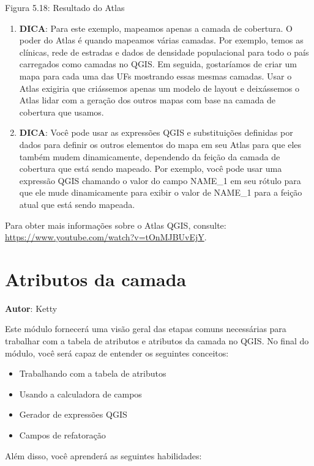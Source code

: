 \documentclass[
]{krantz}
\providecommand{\tightlist}{%
  \setlength{\itemsep}{0pt}\setlength{\parskip}{0pt}}
\begin{document}
Figura 5.18: Resultado do Atlas

\begin{enumerate}
\def\labelenumi{\arabic{enumi}.}
\setcounter{enumi}{6}
\item
  \textbf{DICA}: Para este exemplo, mapeamos apenas a camada de cobertura. O poder do Atlas é quando mapeamos várias camadas. Por exemplo, temos as clínicas, rede de estradas e dados de densidade populacional para todo o país carregados como camadas no QGIS. Em seguida, gostaríamos de criar um mapa para cada uma das UFs mostrando essas mesmas camadas. Usar o Atlas exigiria que criássemos apenas um modelo de layout e deixássemos o Atlas lidar com a geração dos outros mapas com base na camada de cobertura que usamos.
\item
  \textbf{DICA}: Você pode usar as expressões QGIS e substituições definidas por dados para definir os outros elementos do mapa em seu Atlas para que eles também mudem dinamicamente, dependendo da feição da camada de cobertura que está sendo mapeado. Por exemplo, você pode usar uma expressão QGIS chamando o valor do campo NAME\_1 em seu rótulo para que ele mude dinamicamente para exibir o valor de NAME\_1 para a feição atual que está sendo mapeada.
\end{enumerate}

Para obter mais informações sobre o Atlas QGIS, consulte: \url{https://www.youtube.com/watch?v=tOnMJBUvEjY}.

\hypertarget{atributos-da-camada}{%
\chapter{Atributos da camada}\label{atributos-da-camada}}

\textbf{Autor}: Ketty

Este módulo fornecerá uma visão geral das etapas comuns necessárias para trabalhar com a tabela de atributos e atributos da camada no QGIS. No final do módulo, você será capaz de entender os seguintes conceitos:

\begin{itemize}
\tightlist
\item
  Trabalhando com a tabela de atributos
\item
  Usando a calculadora de campos
\item
  Gerador de expressões QGIS
\item
  Campos de refatoração
\end{itemize}

Além disso, você aprenderá as seguintes habilidades:
\end{document}
